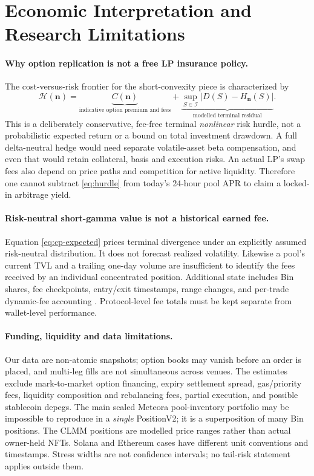 \section{Economic Interpretation and Research Limitations}
\paragraph{Why option replication is not a free LP insurance policy.}
The cost-versus-risk frontier for the short-convexity piece is characterized by
\begin{equation}
\mathcal H(\bm n)=
\underbrace{C(\bm n)}_{\text{indicative option premium and fees}}
+\underbrace{\sup_{S\in\mathcal I}|D(S)-H_{\bm n}(S)|}_{\text{modelled terminal residual}}.
\label{eq:hurdle}
\end{equation}
This is a deliberately conservative, fee-free terminal \emph{nonlinear} risk hurdle, not a probabilistic expected return or a bound on total investment drawdown. A full delta-neutral hedge would need separate volatile-asset beta compensation, and even that would retain collateral, basis and execution risks. An actual LP's swap fees also depend on price paths and competition for active liquidity. Therefore one cannot subtract \eqref{eq:hurdle} from today's 24-hour pool APR to claim a locked-in arbitrage yield.

\paragraph{Risk-neutral short-gamma value is not a historical earned fee.}
Equation \eqref{eq:cp-expected} prices terminal divergence under an explicitly assumed risk-neutral distribution. It does not forecast realized volatility. Likewise a pool's current TVL and a trailing one-day volume are insufficient to identify the fees received by an individual concentrated position. Additional state includes Bin shares, fee checkpoints, entry/exit timestamps, range changes, and per-trade dynamic-fee accounting \cite{meteoraaccounts}. Protocol-level fee totals must be kept separate from wallet-level performance.

\paragraph{Funding, liquidity and data limitations.}
Our data are non-atomic snapshots; option books may vanish before an order is placed, and multi-leg fills are not simultaneous across venues. The estimates exclude mark-to-market option financing, expiry settlement spread, gas/priority fees, liquidity composition and rebalancing fees, partial execution, and possible stablecoin depegs. The main scaled Meteora pool-inventory portfolio may be impossible to reproduce in a \emph{single} PositionV2; it is a superposition of many Bin positions. The CLMM positions are modelled price ranges rather than actual owner-held NFTs. Solana and Ethereum cases have different unit conventions and timestamps. Stress widths are not confidence intervals; no tail-risk statement applies outside them.


